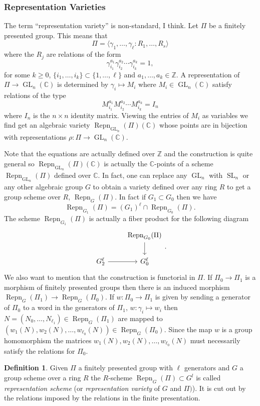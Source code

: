 \documentclass[12pt]{book}
\numberwithin{equation}{section}
\theoremstyle{definition}
\newtheorem{definition}[theorem]{Definition}
\theoremstyle{remark}
\newcommand{\ZZ}{\mathbb{Z}}
\newcommand{\CC}{\mathbb{C}}
\newcommand{\GL}{\operatorname{GL}}
\newcommand{\SL}{\operatorname{SL}}
\newcommand{\Repn}{\operatorname{Repn}}
\begin{document}
\subsubsection{Representation Varieties}
The term ``representation variety'' is non-standard, I think. 
Let $\Pi$ be a finitely presented group. 
This means that 
$$ \Pi = \langle \gamma_1,\ldots,\gamma_{\ell} \colon R_1, \ldots, R_s \rangle$$
where the $R_j$ are relations of the form
$$ \gamma_{i_1}^{a_1} \gamma_{i_2}^{a_2} \cdots \gamma_{i_k}^{a_k} = 1,$$
for some $k\geq 0$, $\lbrace i_1,\ldots, i_k \rbrace \subset \lbrace 1,\ldots, \ell\rbrace$ and $a_1,\ldots, a_k \in \ZZ$. 
A representation of $\Pi\to \GL_n(\CC)$ is determined by $\gamma_i \mapsto M_i$ where $M_i \in \GL_n(\CC)$ satisfy relations of the type 
$$ M_{i_1}^{a_1} M_{i_2}^{a_2} \cdots M_{i_k}^{a_k} = I_n$$
where $I_n$ is the $n\times n$ identity matrix.
Viewing the entries of $M_{i}$ as variables we find get an algebraic variety $\Repn_{\GL_n}(\Pi)(\CC)$ whose points are in bijection with representations $\rho: \Pi \to \GL_n(\CC)$.

Note that the equations are actually defined over $\ZZ$ and the construction is quite general so $\Repn_{\GL_n}(\Pi)(\CC)$ is actually the $\CC$-points of a scheme $\Repn_{\GL_n}(\Pi)$ defined over $\CC$.
In fact,  one can replace any $\GL_n$ with $\SL_n$ or any other algebraic group $G$ to obtain a variety defined over any ring $R$ to get a group scheme over $R$, $\Repn_{G}(\Pi)$. 
In fact if $G_1 \subset G_0$ then we have 
$$ \Repn_{G_1}(\Pi) = (G_1)^{\ell} \cap \Repn_{G_0}(\Pi).$$
The scheme $\Repn_{G_1}(\Pi)$ is actually a fiber product for the following diagram
$$ \begin{tikzcd}
& \Repn_{G_0}(\Pi) \ar[d] \\
G_2^{\ell} \ar[r] & G_0^{\ell}
\end{tikzcd}.$$
We also want to mention that the construction is functorial in $\Pi$.
If $\Pi_0 \to \Pi_1$ is a morphism of finitely presented groups then there is an induced morphism $\Repn_G(\Pi_1) \to \Repn_{G}(\Pi_0)$.
If $w:\Pi_0 \to \Pi_1$ is given by sending a generator of $\Pi_0$ to a word in the generators of $\Pi_1$, $w\colon \gamma_i \mapsto w_i$ then $N=(N_0,\ldots,N_{\ell_1}) \in \Repn_G(\Pi_1)$ are mapped to $(w_1(N), w_2(N),\ldots,w_{\ell_0}(N)) \in \Repn_G(\Pi_0)$.
Since the map $w$ is a group homomorphism the matrices $w_1(N),w_2(N),\ldots,w_{\ell_0}(N)$ must necessarily satisfy the relations for $\Pi_0$.
\begin{definition}
	Given $\Pi$ a finitely presented group with $\ell$ generators and $G$ a group scheme over a ring $R$ the $R$-scheme $\Repn_{G}(\Pi) \subset G^{l}$ is called \emph{representation scheme} (or \emph{representation variety} of $G$ and $\Pi)$). 
	It is cut out by the relations imposed by the relations in the finite presentation.
\end{definition}
\end{document}

